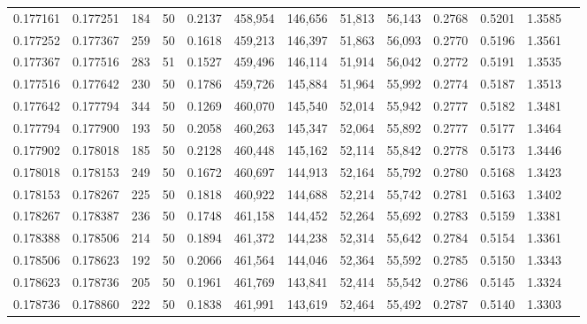 \begin{tabular}{rrrrrrrrrrrrr}
0.177161 & 0.177251 &   184 &  50 &                                     0.2137 & 458,954 & 146,656 &  51,813 &  56,143 & 0.2768 & 0.5201 & 1.3585 \\
0.177252 & 0.177367 &   259 &  50 &                                     0.1618 & 459,213 & 146,397 &  51,863 &  56,093 & 0.2770 & 0.5196 & 1.3561 \\
0.177367 & 0.177516 &   283 &  51 &                                     0.1527 & 459,496 & 146,114 &  51,914 &  56,042 & 0.2772 & 0.5191 & 1.3535 \\
0.177516 & 0.177642 &   230 &  50 &                                     0.1786 & 459,726 & 145,884 &  51,964 &  55,992 & 0.2774 & 0.5187 & 1.3513 \\
0.177642 & 0.177794 &   344 &  50 &                                     0.1269 & 460,070 & 145,540 &  52,014 &  55,942 & 0.2777 & 0.5182 & 1.3481 \\
0.177794 & 0.177900 &   193 &  50 &                                     0.2058 & 460,263 & 145,347 &  52,064 &  55,892 & 0.2777 & 0.5177 & 1.3464 \\
0.177902 & 0.178018 &   185 &  50 &                                     0.2128 & 460,448 & 145,162 &  52,114 &  55,842 & 0.2778 & 0.5173 & 1.3446 \\
0.178018 & 0.178153 &   249 &  50 &                                     0.1672 & 460,697 & 144,913 &  52,164 &  55,792 & 0.2780 & 0.5168 & 1.3423 \\
0.178153 & 0.178267 &   225 &  50 &                                     0.1818 & 460,922 & 144,688 &  52,214 &  55,742 & 0.2781 & 0.5163 & 1.3402 \\
0.178267 & 0.178387 &   236 &  50 &                                     0.1748 & 461,158 & 144,452 &  52,264 &  55,692 & 0.2783 & 0.5159 & 1.3381 \\
0.178388 & 0.178506 &   214 &  50 &                                     0.1894 & 461,372 & 144,238 &  52,314 &  55,642 & 0.2784 & 0.5154 & 1.3361 \\
0.178506 & 0.178623 &   192 &  50 &                                     0.2066 & 461,564 & 144,046 &  52,364 &  55,592 & 0.2785 & 0.5150 & 1.3343 \\
0.178623 & 0.178736 &   205 &  50 &                                     0.1961 & 461,769 & 143,841 &  52,414 &  55,542 & 0.2786 & 0.5145 & 1.3324 \\
0.178736 & 0.178860 &   222 &  50 &                                     0.1838 & 461,991 & 143,619 &  52,464 &  55,492 & 0.2787 & 0.5140 & 1.3303 \\

\end{tabular}
